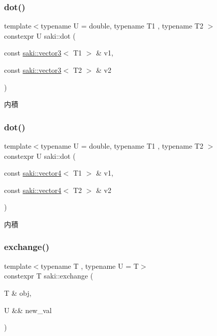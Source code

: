 \subsubsection{\texorpdfstring{dot()}{dot()}\hspace{0.1cm}{\footnotesize\ttfamily [2/3]}}
{\footnotesize\ttfamily template$<$typename U  = double, typename T1 , typename T2 $>$ \\
constexpr U saki\+::dot (\begin{DoxyParamCaption}\item[{const \mbox{\hyperlink{classsaki_1_1vector3}{saki\+::vector3}}$<$ T1 $>$ \&}]{v1,  }\item[{const \mbox{\hyperlink{classsaki_1_1vector3}{saki\+::vector3}}$<$ T2 $>$ \&}]{v2 }\end{DoxyParamCaption})}



内積 

\mbox{\label{namespacesaki_a990ff61a01d4cf819df3fe2774842acf}} 
\subsubsection{\texorpdfstring{dot()}{dot()}\hspace{0.1cm}{\footnotesize\ttfamily [3/3]}}
{\footnotesize\ttfamily template$<$typename U  = double, typename T1 , typename T2 $>$ \\
constexpr U saki\+::dot (\begin{DoxyParamCaption}\item[{const \mbox{\hyperlink{classsaki_1_1vector4}{saki\+::vector4}}$<$ T1 $>$ \&}]{v1,  }\item[{const \mbox{\hyperlink{classsaki_1_1vector4}{saki\+::vector4}}$<$ T2 $>$ \&}]{v2 }\end{DoxyParamCaption})}



内積 

\mbox{\label{namespacesaki_ace0188c33098d6ac615fc71e64ab6dda}} 
\subsubsection{\texorpdfstring{exchange()}{exchange()}}
{\footnotesize\ttfamily template$<$typename T , typename U  = T$>$ \\
constexpr T saki\+::exchange (\begin{DoxyParamCaption}\item[{T \&}]{obj,  }\item[{U \&\&}]{new\+\_\+val }\end{DoxyParamCaption})}



